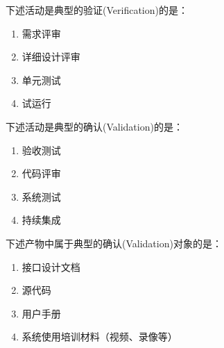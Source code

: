 \begin{problem}
	下述活动是典型的验证(Verification)的是：
    \vspace{-0.8em}
    \begin{multicols}{4}
        \begin{enumerate}[label=\Alph*.]
            \item 需求评审
            \item 详细设计评审
            \item 单元测试
            \item 试运行
        \end{enumerate}
    \end{multicols}
    \vspace{-1em}
\end{problem}



\begin{problem}
	下述活动是典型的确认(Validation)的是：
    \vspace{-0.8em}
    \begin{multicols}{4}
        \begin{enumerate}[label=\Alph*.]
            \item 验收测试
            \item 代码评审
            \item 系统测试
            \item 持续集成
        \end{enumerate}
    \end{multicols}
    \vspace{-1em}
\end{problem}



\begin{problem}
    下述产物中属于典型的确认(Validation)对象的是：
    \vspace{-0.8em}
    \begin{multicols}{2}
        \begin{enumerate}[label=\Alph*.]
            \item 接口设计文档
            \item 源代码
            \item 用户手册
            \item 系统使用培训材料（视频、录像等）
        \end{enumerate}
    \end{multicols}
    \vspace{-1em}
\end{problem}



